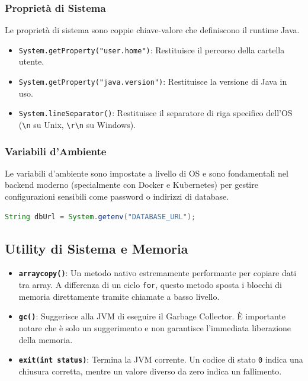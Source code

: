 \subsubsection{Proprietà di Sistema}
Le proprietà di sistema sono coppie chiave-valore che definiscono il runtime Java.
\begin{itemize}
    \item \texttt{System.getProperty("user.home")}: Restituisce il percorso della cartella utente.
    \item \texttt{System.getProperty("java.version")}: Restituisce la versione di Java in uso.
    \item \texttt{System.lineSeparator()}: Restituisce il separatore di riga specifico dell'OS (\texttt{\textbackslash n} su Unix, \texttt{\textbackslash r\textbackslash n} su Windows).
\end{itemize}

\subsubsection{Variabili d'Ambiente}
Le variabili d'ambiente sono impostate a livello di OS e sono fondamentali nel backend moderno (specialmente con Docker e Kubernetes) per gestire configurazioni sensibili come password o indirizzi di database.
\begin{lstlisting}[language=Java]
String dbUrl = System.getenv("DATABASE_URL");
\end{lstlisting}

\subsection{Utility di Sistema e Memoria}

\begin{itemize}
    \item \textbf{\texttt{arraycopy()}}: Un metodo nativo estremamente performante per copiare dati tra array. A differenza di un ciclo \texttt{for}, questo metodo sposta i blocchi di memoria direttamente tramite chiamate a basso livello.
    \item \textbf{\texttt{gc()}}: Suggerisce alla JVM di eseguire il Garbage Collector. È importante notare che è solo un suggerimento e non garantisce l'immediata liberazione della memoria.
    \item \textbf{\texttt{exit(int status)}}: Termina la JVM corrente. Un codice di stato \texttt{0} indica una chiusura corretta, mentre un valore diverso da zero indica un fallimento.
\end{itemize}

